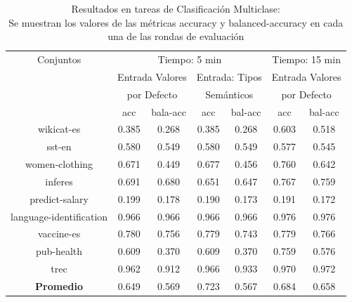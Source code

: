 \begin{table}
  \centering
  \resizebox{15cm}{!} {
    \begin{tabular}{|c|cccccc|}
   \hline
   Conjuntos & \multicolumn{4}{P{8cm}|}{Tiempo: 5 min}  & \multicolumn{2}{P{4cm}|}{Tiempo: 15 min}\\  
    \cline{2-7}
          & \multicolumn{2}{P{4cm}|}{Entrada Valores} & \multicolumn{2}{P{4cm}|}{Entrada: Tipos} & \multicolumn{2}{P{4cm}|}{Entrada Valores}\\ 
          & \multicolumn{2}{P{4cm}|}{por Defecto} & \multicolumn{2}{P{4cm}|}{Semánticos} & \multicolumn{2}{P{4cm}|}{por Defecto}\\ 
    \cline{2-7}
                 & acc & bala-acc & acc  & bal-acc & acc & bal-acc  \\ \hline
  wikicat-es              & 0.385 & 0.268 & 0.385 & 0.268 & 0.603 & 0.518 \\
  sst-en                  & 0.580 & 0.549 & 0.580 & 0.549 & 0.577 & 0.545 \\
  women-clothing          & 0.671 & 0.449 & 0.677 & 0.456 & 0.760 & 0.642 \\ 
  inferes                 & 0.691 & 0.680 & 0.651 & 0.647 & 0.767 & 0.759 \\
  predict-salary          & 0.199 & 0.178 & 0.190 & 0.173 & 0.191 & 0.172 \\
  language-identification & 0.966 & 0.966 & 0.966 & 0.966 & 0.976 & 0.976 \\
  vaccine-es              & 0.780 & 0.756 & 0.779 & 0.743 & 0.779 & 0.766 \\
  pub-health              & 0.609 & 0.370 & 0.609 & 0.370 & 0.759 & 0.576 \\ 
  trec                    & 0.962 & 0.912 & 0.966 & 0.933 & 0.970 & 0.972 \\ \hline
  \textbf{Promedio}       & 0.649 & 0.569 & 0.723 & 0.567 & 0.684 & 0.658 \\ \hline


    \end{tabular}
  \caption{Resultados en tareas de Clasificación Multiclase:
  \\Se muestran los valores de las métricas accuracy y balanced-accuracy en cada una de las rondas de evaluación}
  \label{fig:class-multi}
  }
\end{table}

